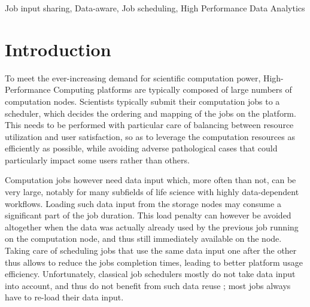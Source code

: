 \documentclass[conference,10pt]{IEEEtran}
\begin{document}
\begin{abstract}
  
  

  
\end{abstract}


\begin{IEEEkeywords}
Job input sharing,
Data-aware,
Job scheduling,
High Performance Data Analytics
\end{IEEEkeywords}

\section{Introduction}\label{sec.introduction}

To meet the ever-increasing demand for scientific computation power,
High-Performance Computing platforms are typically composed of large
numbers of computation nodes. Scientists typically submit their
computation jobs to a scheduler, which decides the ordering and mapping
of the jobs on the platform. This needs to be performed with particular
care of balancing between resource utilization and user satisfaction, so
as to leverage the computation resources as efficiently as possible,
while avoiding adverse pathological cases that could particularly impact
some users rather than others.

Computation jobs however need data input which, more often than not, can
be very large, notably for many subfields of life science with highly
data-dependent workflows. Loading such data input from the storage
nodes may consume a significant part of the job duration. This load
penalty can however be avoided altogether when the data was actually
already used by the previous job running on the computation node, and
thus still immediately available on the node. Taking care of scheduling
jobs that use the same data input one after the other thus allows to
reduce the jobs completion times, leading to better platform usage
efficiency. Unfortunately, classical job schedulers mostly do not take
data input into account, and thus do not benefit from such data reuse ;
most jobs always have to re-load their data input.
\end{document}
